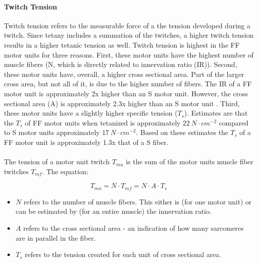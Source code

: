 \paragraph{Twitch Tension}
Twitch tension refers to the measurable force of a the tension developed during a twitch. Since tetany includes a summation of the twitches, a higher twitch tension results in a higher tetanic tension as well. Twitch tension is highest in the FF motor units for three reasons. First, these motor units have the highest number of muscle fibers (N, which is directly related to innervation ratio (IR)). Second, these motor units have, overall, a higher cross sectional area. Part of the larger cross area, but not all of it, is due to the higher number of fibers. The IR of a FF motor unit is approximately 2x higher than an S motor unit. However, the cross sectional area (A) is approximately 2.3x higher than an S motor unit \cite{bodine_maximal_1987, buchthal_motor_1980}. Third, these motor units have a slightly higher specific tension ($T_s$). Estimates are that the $T_s$ of FF motor units when tetanized is approximately $22 \ N \cdot cm^{-2}$ compared to S motor units approximately $17 \ N \cdot cm^{-2}$. Based on these estimates the $T_s$ of a FF motor unit is approximately 1.3x that of a S fiber. 

\paragraph{}

The tension of a motor unit twitch $T_{mu}$ is the sum of the motor units muscle fiber twitches $T_{mf}$. The equation:

\begin{equation}
    T_{mu} = N \cdot T_{mf} = N \cdot A \cdot T_s
\end{equation}

\begin{itemize}
    \item $N$ refers to the number of muscle fibers. This either is (for one motor unit) or can be estimated by (for an entire muscle) the innervation ratio.\footnotemark{}
    \item $A$ refers to the cross sectional area - an indication of how many sarcomeres are in parallel in the fiber.
    \item $T_s$ refers to the tension created for each unit of cross sectional area.
\end{itemize}


